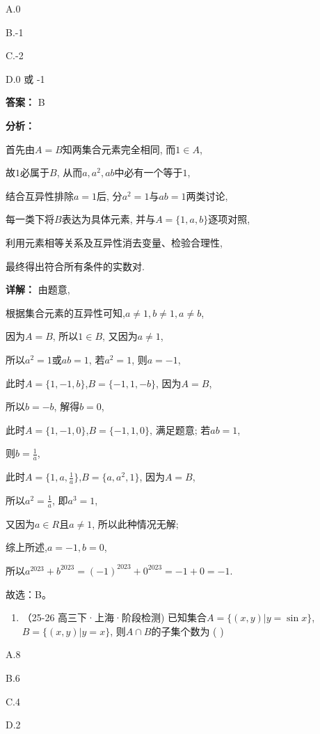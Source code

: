 \documentclass[11pt,a4paper]{ctexart}
\begin{document}
A.0

B.-1

C.-2

D.0 或 -1

\textbf{答案：}
B

\textbf{分析：}

首先由\(A = B\)知两集合元素完全相同, 而\(1 \in A\),

故\(1\)必属于\(B\), 从而\(a, a^2, ab\)中必有一个等于\(1\),

结合互异性排除\(a = 1\)后, 分\(a^2 = 1\)与\(ab = 1\)两类讨论,

每一类下将\(B\)表达为具体元素, 并与\(A = \{1, a, b\}\)逐项对照,

利用元素相等关系及互异性消去变量、检验合理性,

最终得出符合所有条件的实数对.

\textbf{详解：}
由题意,

根据集合元素的互异性可知,\(a \neq 1, b \neq 1, a \neq b\),

因为\(A = B\), 所以\(1 \in B\), 又因为\(a \neq 1\),

所以\(a^2 = 1\)或\(ab = 1\), 若\(a^2 = 1\), 则\(a = -1\),

此时\(A = \{1, -1, b\}\),\(B = \{-1, 1, -b\}\), 因为\(A = B\),

所以\(b = -b\), 解得\(b = 0\),

此时\(A = \{1, -1, 0\}\),\(B = \{-1, 1, 0\}\), 满足题意; 若\(ab = 1\),

则\(b = \frac{1}{a}\),

此时\(A = \{1, a, \frac{1}{a}\}\),\(B = \{a, a^2, 1\}\), 因为\(A = B\),

所以\(a^2 = \frac{1}{a}\), 即\(a^3 = 1\),

又因为\(a \in R\)且\(a \neq 1\), 所以此种情况无解;

综上所述,\(a = -1, b = 0\),

所以\(a^{2023} + b^{2023} = (-1)^{2023} + 0^{2023} = -1 + 0 = -1\).

故选：B。

\begin{enumerate}[label=\arabic*., leftmargin=*, start=7]
\item （25-26 高三下·上海·阶段检测)
  已知集合\(A = \{(x, y) | y = \sin x\}\),\(B = \{(x, y) | y = x\}\),
  则\(A \cap B\)的子集个数为 ( )
\end{enumerate}

A.8

B.6

C.4

D.2
\end{document}
